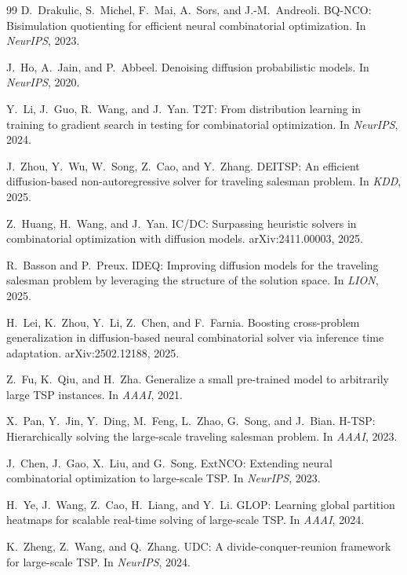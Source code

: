 \documentclass[11pt,a4paper]{article}
\begin{document}
\begin{thebibliography}{99}
D.~Drakulic, S.~Michel, F.~Mai, A.~Sors, and J.-M.~Andreoli.
\newblock BQ-NCO: Bisimulation quotienting for efficient neural combinatorial optimization.
\newblock In \emph{NeurIPS}, 2023.

J.~Ho, A.~Jain, and P.~Abbeel.
\newblock Denoising diffusion probabilistic models.
\newblock In \emph{NeurIPS}, 2020.

Y.~Li, J.~Guo, R.~Wang, and J.~Yan.
\newblock T2T: From distribution learning in training to gradient search in testing for combinatorial optimization.
\newblock In \emph{NeurIPS}, 2024.

J.~Zhou, Y.~Wu, W.~Song, Z.~Cao, and Y.~Zhang.
\newblock DEITSP: An efficient diffusion-based non-autoregressive solver for traveling salesman problem.
\newblock In \emph{KDD}, 2025.

Z.~Huang, H.~Wang, and J.~Yan.
\newblock IC/DC: Surpassing heuristic solvers in combinatorial optimization with diffusion models.
\newblock arXiv:2411.00003, 2025.

R.~Basson and P.~Preux.
\newblock IDEQ: Improving diffusion models for the traveling salesman problem by leveraging the structure of the solution space.
\newblock In \emph{LION}, 2025.

H.~Lei, K.~Zhou, Y.~Li, Z.~Chen, and F.~Farnia.
\newblock Boosting cross-problem generalization in diffusion-based neural combinatorial solver via inference time adaptation.
\newblock arXiv:2502.12188, 2025.

Z.~Fu, K.~Qiu, and H.~Zha.
\newblock Generalize a small pre-trained model to arbitrarily large TSP instances.
\newblock In \emph{AAAI}, 2021.

X.~Pan, Y.~Jin, Y.~Ding, M.~Feng, L.~Zhao, G.~Song, and J.~Bian.
\newblock H-TSP: Hierarchically solving the large-scale traveling salesman problem.
\newblock In \emph{AAAI}, 2023.

J.~Chen, J.~Gao, X.~Liu, and G.~Song.
\newblock ExtNCO: Extending neural combinatorial optimization to large-scale TSP.
\newblock In \emph{NeurIPS}, 2023.

H.~Ye, J.~Wang, Z.~Cao, H.~Liang, and Y.~Li.
\newblock GLOP: Learning global partition heatmaps for scalable real-time solving of large-scale TSP.
\newblock In \emph{AAAI}, 2024.

K.~Zheng, Z.~Wang, and Q.~Zhang.
\newblock UDC: A divide-conquer-reunion framework for large-scale TSP.
\newblock In \emph{NeurIPS}, 2024.


\end{thebibliography}
\end{document}
